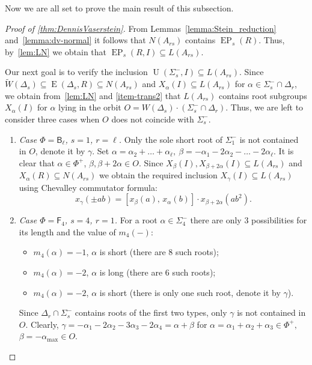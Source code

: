 \documentclass[11pt]{amsart}
\theoremstyle{plain}
\numberwithin{equation}{section}
\numberwithin{lemma}{section}
\theoremstyle{definition}
\theoremstyle{remark}
\DeclareMathOperator{\E}{E}
\DeclareMathOperator{\EP}{EP}
\DeclareMathOperator{\U}{U}
\newcommand{\rB}{\mathsf{B}}
\newcommand{\rF}{\mathsf{F}}
\begin{document}
Now we are all set to prove the main result of this subsection.
\begin{proof} [Proof of \cref{thm:DennisVaserstein}]
From Lemmas~\ref{lemma:Stein_reduction} and~\ref{lemma:dv-normal} it follows that $N(A_{rs})$ contains $\EP_s(R)$.
Thus, by~\cref{lem:LN} we obtain that $\EP_s(R, I) \subseteq L(A_{rs})$.

Our next goal is to verify the inclusion $\U(\Sigma_s^-, I) \subseteq L(A_{rs})$.
Since $\widetilde{W}(\Delta_s) \subseteq \E(\Delta_s, R) \subseteq N(A_{rs})$ and 
 $X_{\alpha}(I) \subseteq L(A_{rs})$ for $\alpha \in \Sigma^-_s\cap \Delta_r$, 
we obtain from~\cref{lem:LN} and \cref{item-trans2} that $L(A_{rs})$ contains root subgroups $X_\alpha(I)$ for $\alpha$ lying in the orbit $O = W(\Delta_s) \cdot (\Sigma^-_s\cap \Delta_r)$.
Thus, we are left to consider three cases when $O$ does not coincide with $\Sigma^-_s$. 
\begin{enumerate} 
  \item \textit{Case $\Phi = \rB_\ell$, $s=1$, $r=\ell$.} 
 Only the sole short root of $\Sigma_1^-$ is not contained in $O$, denote it by $\gamma$.
 Set $\alpha = \alpha_2 + \ldots + \alpha_\ell,\ \beta = -\alpha_1 - 2\alpha_2 - \ldots -2\alpha_\ell.$
 It is clear that $\alpha \in \Phi^+$, $\beta, \beta + 2\alpha \in O$.
 Since $X_{\beta}(I), X_{\beta+2\alpha}(I) \subseteq L(A_{rs})$ and $X_{\alpha}(R) \subseteq N(A_{rs})$ we obtain the required inclusion $X_{\gamma}(I) \subseteq L(A_{rs})$ using Chevalley commutator formula:
 \begin{equation} \nonumber x_{\gamma}(\pm ab) = [x_{\beta}(a),\, x_{\alpha}(b)] \cdot x_{\beta + 2\alpha}(ab^2). \end{equation}
 \item \textit{Case $\Phi = \rF_4$, $s=4$, $r=1$.}
 For a root $\alpha\in \Sigma_4^-$ there are only $3$ possibilities for its length and the value of $m_4(-)$:
 \begin{itemize}
  \item $m_4(\alpha) = -1$, $\alpha$ is short (there are 8 such roots);
  \item $m_4(\alpha) = - 2$, $\alpha$ is long (there are 6 such roots);
  \item $m_4(\alpha) = - 2$, $\alpha$ is short (there is only one such root, denote it by $\gamma$).
 \end{itemize}
 Since $\Delta_r \cap \Sigma_s^-$ contains roots of the first two types, only $\gamma$ is not contained in $O$.
 Clearly, $\gamma = -\alpha_1 -2\alpha_2-3\alpha_3-2\alpha_4 = \alpha + \beta$ for $\alpha = \alpha_1 + \alpha_2 + \alpha_3\in \Phi^+,$ $\beta = -\alpha_{{\max}} \in O$.

\end{enumerate}
\end{proof}
\end{document}
